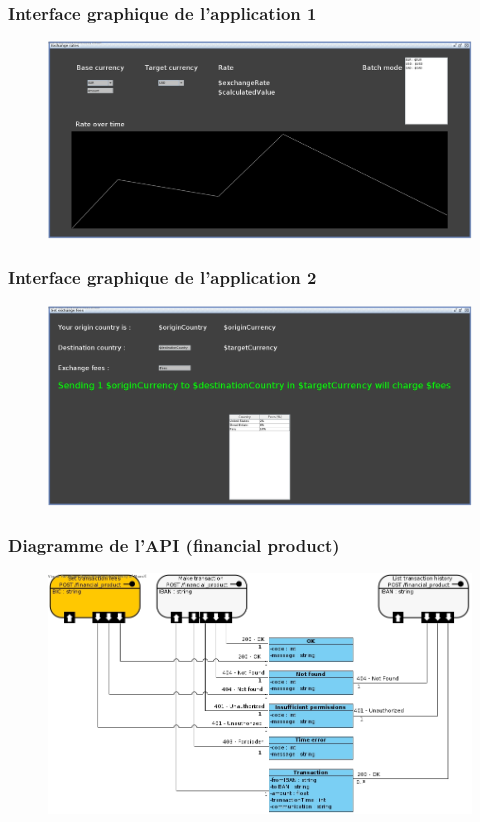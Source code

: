 \documentclass[../rapport.tex]{subfiles}
\begin{document}
\subsubsection{Interface graphique de l'application 1}
\begin{figure}[H]
    \includegraphics[scale=0.288]{ressources/photos_diagrammes/extensionUgo/ExchangeRateScene.jpg}
\end{figure}

\subsubsection{Interface graphique de l'application 2}
\begin{figure}[H]
    \includegraphics[scale=0.258]{ressources/photos_diagrammes/extensionUgo/setFeesScene.jpg}
\end{figure}

\subsubsection{Diagramme de l'API (financial product)}
\begin{figure}[H]
    \includegraphics[scale=0.288]{ressources/photos_diagrammes/extensionUgo/financial_productAPI.jpg}
\end{figure}
\end{document}
